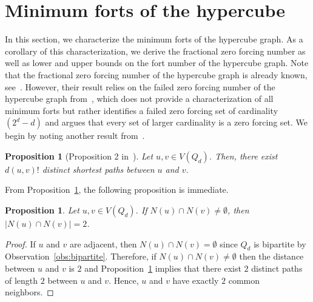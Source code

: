 \documentclass[twoside, 12pt]{article}
\newtheorem{proposition}[theorem]{Proposition}
\theoremstyle{definition}
\newcommand\abs[1]{\left|#1\right|}
\begin{document}
\section{Minimum forts of the hypercube}\label{sec:minimum_forts}
In this section, we characterize the minimum forts of the hypercube graph. 
As a corollary of this characterization, we derive the fractional zero forcing number as well as lower and upper bounds on the fort number of the hypercube graph. 
Note that the fractional zero forcing number of the hypercube graph is already known, see~\cite[Proposition 3.15]{Cameron2023}.
However, their result relies on the failed zero forcing number of the hypercube graph from~\cite[Theorem 4.2]{Afzali2024}, which does not provide a characterization of all minimum forts but rather identifies a failed zero forcing set of cardinality $(2^{d}-d)$ and argues that every set of larger cardinality is a zero forcing set. 
We begin by noting another result from~\cite{Foldes1977}.
\begin{proposition}[Proposition 2 in~\cite{Foldes1977}]\label{prop:paths}
Let $u,v\in V(Q_{d})$.
Then, there exist $d(u,v)!$ distinct shortest paths between $u$ and $v$. 
\end{proposition}
From Proposition~\ref{prop:paths}, the following proposition is immediate.
\begin{proposition}\label{prop:4cycle}
Let $u,v\in V(Q_{d})$.
If $N(u)\cap N(v)\neq\emptyset$, then $\abs{N(u)\cap N(v)}=2$.
\end{proposition}
\begin{proof}
If $u$ and $v$ are adjacent, then $N(u)\cap N(v)=\emptyset$ since $Q_{d}$ is bipartite by Observation~\ref{obs:bipartite}. 
Therefore, if $N(u)\cap N(v)\neq\emptyset$ then the distance between $u$ and $v$ is $2$ and Proposition~\ref{prop:paths} implies that there exist $2$ distinct paths of length $2$ between $u$ and $v$. 
Hence, $u$ and $v$ have exactly $2$ common neighbors. 
\end{proof}
\end{document}
